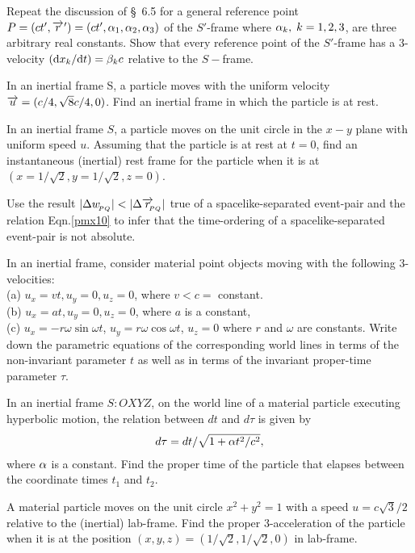 \exise Repeat the discussion of \S~6.5 for a general 
reference point $P=(ct', {\overrightarrow{r}\hspace*{.3pt}'})=(ct', {\alpha}_1, 
{\alpha}_2,{\alpha}_3)$ of the $S'$-frame where $ 
{\alpha}_k,\;k=1,2,3$, 
are three arbitrary real constants. Show that every 
reference point of the $S'$-frame has a 3-velocity 
$(\mathrm{d} 
x_k/\mathrm{d} t)={\beta}_k c$ relative to the $S-$frame.

\exise In an inertial frame S, a particle moves with 
the 
uniform velocity $\overrightarrow{u} = (c/4, \sqrt{8}c/4, 0) $. 
Find 
an inertial frame in which the particle is at rest. 

\exise In an inertial frame $S$, a particle moves on 
the 
unit circle in the $x-y$ plane with uniform speed $u$. 
Assuming that the particle is at rest at $t = 0$, find 
an 
instantaneous (inertial) rest frame for the particle 
when 
it is at $(x = 1/\sqrt{2}, y = 1/\sqrt{2}, z = 0)$.

\exise  Use the result $|\Delta w_{_{\hspace*{-1.5pt}{PQ}}}| < |\Delta
\overrightarrow{r}_{_{\hspace*{-1.5pt}{\negthinspace\negthinspace PQ}}}|$ true of a  spacelike-separated
event-pair and the relation Eqn.\eqref{pmx10} to infer 
that
{the time-ordering of a spacelike-separated event-pair is
not absolute}.

\exise  In an inertial frame, consider material point
objects moving with the following 3-velocities:   \\
(a) $ u_x=vt, u_y=0, u_z=0$, where $ v < c = $ constant.\\
(b) $ u_x=a t, u_y=0, u_z=0$, where $ a$ is a constant,\\
(c) $ u_x=-r\omega\sin\omega t $,  $ u_y=r\omega\cos\omega t
$, $u_ z=0$ where $ r $ and $\omega$ are constants.
Write down the parametric equations of  the corresponding 
world lines in terms of the non-invariant parameter $t$ as 
well as in terms of the invariant proper-time parameter 
$\tau $.

\exise In an inertial frame $S:OXYZ $, on the world line of a
material particle  executing hyperbolic motion, the relation
between  $ dt $ and  $d\tau$ is given by \begin{align*}
d\tau=dt/\sqrt{1+{\alpha} t^2/c^2}, \end{align*} where ${\alpha}$
is a constant. Find the proper time of the particle that elapses
between the coordinate times $ t_1$ and $ t_2$.

\exise  A material particle moves on the  unit circle $
x^2+y^2=1$ with a speed $u =c\sqrt{3}/2$ relative to the
(inertial) lab-frame. Find the proper 3-acceleration of the
particle when it is at the position
$(x,y,z)=(1/\sqrt{2},1/\sqrt{2},0)$ in lab-frame.

